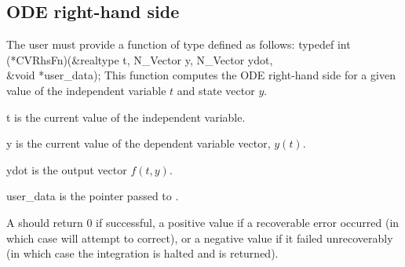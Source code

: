 \subsection{ODE right-hand side} \label{ss:rhsFn}
The user must provide a function of type  defined as follows:
{
  typedef int (*CVRhsFn)(&realtype t, N\_Vector y, N\_Vector ydot, \\
                         &void *user\_data);
}
{
  This function computes the ODE right-hand side for a given value
  of the independent variable $t$ and state vector $y$.
}
{
  \begin{args}
  \item[t]
    is the current value of the independent variable.
  \item[y]
    is the current value of the dependent variable vector, $y(t)$.
  \item[ydot]
    is the output vector $f(t,y)$.
  \item[user\_data]
    is the       
    pointer passed to .   
  \end{args}
}
{
  A  should return 0 if successful, a positive value if a recoverable
  error occurred (in which case {\cvodes} will attempt to correct), or a negative 
  value if it failed unrecoverably (in which case the integration is halted and
   is returned).
}
